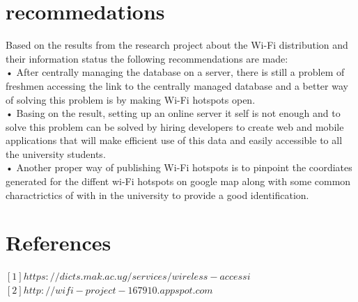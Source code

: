 \documentclass[14pt, a4paper]{article}
\begin{document}
			\section{recommedations}
Based on the results from the research project about the Wi-Fi distribution and their information status the following recommendations are made:\\

•	After centrally managing the database on a server, there is still a problem of freshmen accessing the link to the centrally managed database and a better way of solving this problem is by making Wi-Fi hotspots open.\\

•	Basing on the result, setting up an online server it self is not enough and to solve this problem can be solved by hiring developers to create web and mobile applications that will make efficient use of this data and easily accessible to all the university students.\\

•	Another proper way of publishing Wi-Fi hotspots is to pinpoint the coordiates generated for the diffent wi-Fi hotspots on google map along with some common charactrictics of with in the university to provide a good identification. \\

		\section{References}
$[1]https://dicts.mak.ac.ug/services/wireless-accessi$\\
$[2] http://wifi-project-167910.appspot.com $\\


			

				
	

	
\end{document}
